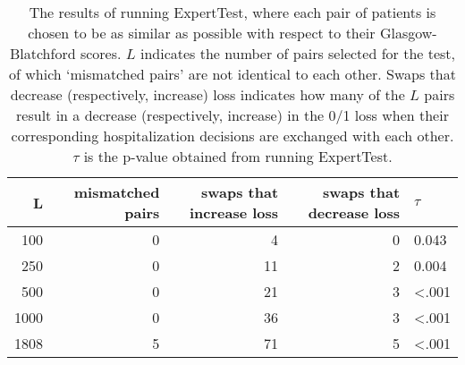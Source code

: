 \begin{table}[!htbp]
\centering
\begin{tabular}{rrrrl}
  \toprule L & mismatched pairs & swaps that increase loss & swaps that decrease loss & $\tau$ \\ 
  \midrule 100 & 0 & 4 & 0 & 0.043 \\ 
  250 & 0 & 11 & 2 & 0.004 \\ 
  500 & 0 & 21 & 3 & <.001 \\ 
  1000 & 0 & 36 & 3 & <.001 \\ 
  1808 & 5 & 71 & 5 & <.001 \\ 
   \bottomrule \end{tabular}
\caption{The results of running ExpertTest, where each pair of patients is chosen to be as similar as possible with respect to their Glasgow-Blatchford scores. $L$ indicates the number of pairs selected for the test, of which `mismatched pairs' are not identical to each other.
                   Swaps that decrease (respectively, increase) loss indicates how many of the $L$ pairs result in a decrease (respectively, increase) in the 0/1 loss
                   when their corresponding hospitalization decisions are exchanged with each other. $\tau$ is the p-value obtained
                   from running ExpertTest.} 
\label{tab:testing for expertise score_only}
\end{table}
